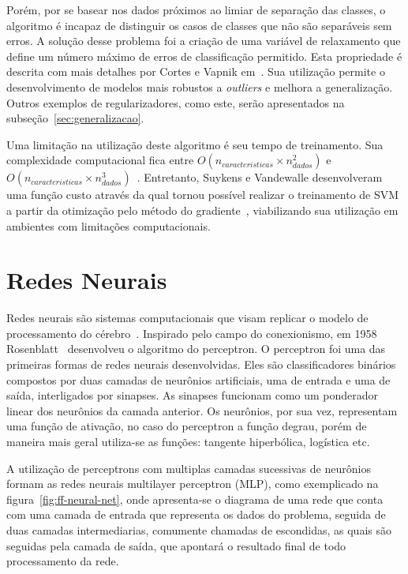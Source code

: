 Porém, por se basear nos dados próximos ao limiar de separação das classes, o algoritmo é incapaz de distinguir os casos
de classes que não são separáveis sem erros.
A solução desse problema foi a criação de uma variável de relaxamento que define um número máximo de erros de
classificação permitido.
Esta propriedade é descrita com mais detalhes por Cortes e Vapnik em~\cite{cortes95}.
Sua utilização permite o desenvolvimento de modelos mais robustos a \textit{outliers} e melhora a generalização.
Outros exemplos de regularizadores, como este, serão apresentados na subseção~\ref{sec:generalizacao}.

Uma limitação na utilização deste algoritmo é seu tempo de treinamento.
Sua complexidade computacional fica entre $O(n_{caracteristicas} \times n_{dados}^2)$ e
$O(n_{caracteristicas} \times n_{dados}^3)$~\cite{list09}.
Entretanto, Suykens e Vandewalle desenvolveram uma função custo através da qual tornou possível realizar o treinamento
de SVM a partir da otimização pelo método do gradiente~\cite{suykens99}, viabilizando sua utilização em ambientes com
limitações computacionais.

\section{Redes Neurais} \label{sec:nn}

Redes neurais são sistemas computacionais que visam replicar o modelo de processamento do cérebro~\cite{wiener61}.
Inspirado pelo campo do conexionismo, em 1958 Rosenblatt~\cite{rosenblatt58} desenvolveu o algoritmo do perceptron.
O perceptron foi uma das primeiras formas de redes neurais desenvolvidas.
Eles são classificadores binários compostos por duas camadas de neurônios artificiais, uma de entrada e uma de saída,
interligados por sinapses.
As sinapses funcionam como um ponderador linear dos neurônios da camada anterior.
Os neurônios, por sua vez, representam uma função de ativação, no caso do perceptron a função degrau, porém de maneira
mais geral utiliza-se as funções: tangente hiperbólica, logística etc.

A utilização de perceptrons com multiplas camadas sucessivas de neurônios formam as redes neurais multilayer perceptron
(MLP), como exemplicado na figura~\ref{fig:ff-neural-net}, onde apresenta-se o diagrama de uma rede que conta com uma
camada de entrada que representa os dados do problema, seguida de duas camadas intermediarias, comumente chamadas de
escondidas, as quais são seguidas pela camada de saída, que apontará o resultado final de todo processamento da rede.

